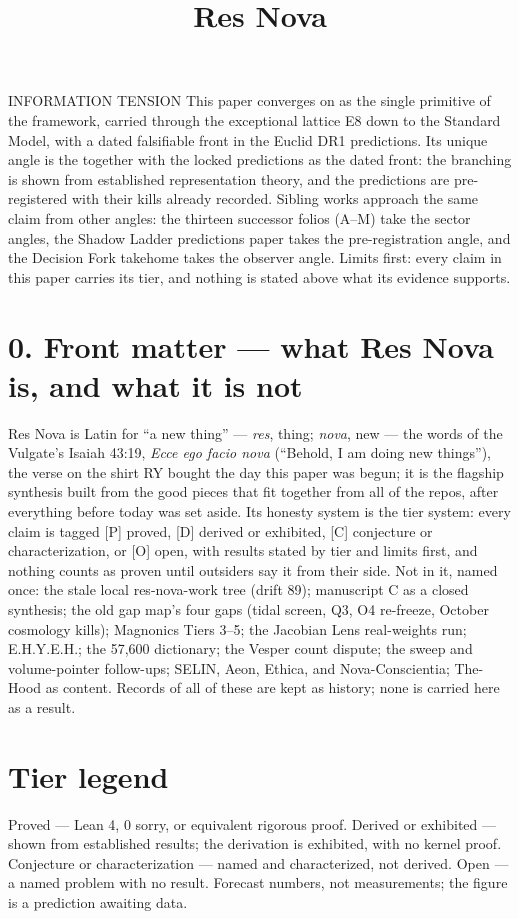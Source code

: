 \documentclass{alienfolio}
\title{Res Nova}
\begin{document}
\makecover

\begin{convergence}{INFORMATION TENSION}
This paper converges on  as the single primitive of the framework, carried through the exceptional lattice E8 down to the Standard Model, with a dated falsifiable front in the Euclid DR1 predictions. Its unique angle is the  together with the locked predictions as the dated front: the branching is shown from established representation theory, and the predictions are pre-registered with their kills already recorded. Sibling works approach the same claim from other angles: the thirteen successor folios (A--M) take the sector angles, the Shadow Ladder predictions paper takes the pre-registration angle, and the Decision Fork takehome takes the observer angle. Limits first: every claim in this paper carries its tier, and nothing is stated above what its evidence supports.
\end{convergence}

\goldrule

\section*{0. Front matter --- what Res Nova is, and what it is not}
\label{sec:frontmatter}
Res Nova is Latin for ``a new thing'' --- \textit{res}, thing; \textit{nova}, new --- the words of the Vulgate's Isaiah 43:19, \textit{Ecce ego facio nova} (``Behold, I am doing new things''), the verse on the shirt RY bought the day this paper was begun; it is the flagship synthesis built from the good pieces that fit together from all of the repos, after everything before today was set aside. Its honesty system is the tier system: every claim is tagged [P] proved, [D] derived or exhibited, [C] conjecture or characterization, or [O] open, with results stated by tier and limits first, and nothing counts as proven until outsiders say it from their side. Not in it, named once: the stale local res-nova-work tree (drift 89); manuscript C as a closed synthesis; the old gap map's four gaps (tidal screen, Q3, O4 re-freeze, October cosmology kills); Magnonics Tiers 3--5; the Jacobian Lens real-weights run; E.H.Y.E.H.; the 57,600 dictionary; the Vesper count dispute; the sweep and volume-pointer follow-ups; SELIN, Aeon, Ethica, and Nova-Conscientia; The-Hood as content. Records of all of these are kept as history; none is carried here as a result.

\section*{Tier legend}
\label{sec:tiers}
 Proved --- Lean 4, 0 sorry, or equivalent rigorous proof.  Derived or exhibited --- shown from established results; the derivation is exhibited, with no kernel proof.  Conjecture or characterization --- named and characterized, not derived.  Open --- a named problem with no result.  Forecast numbers, not measurements; the figure is a prediction awaiting data.
\end{document}
